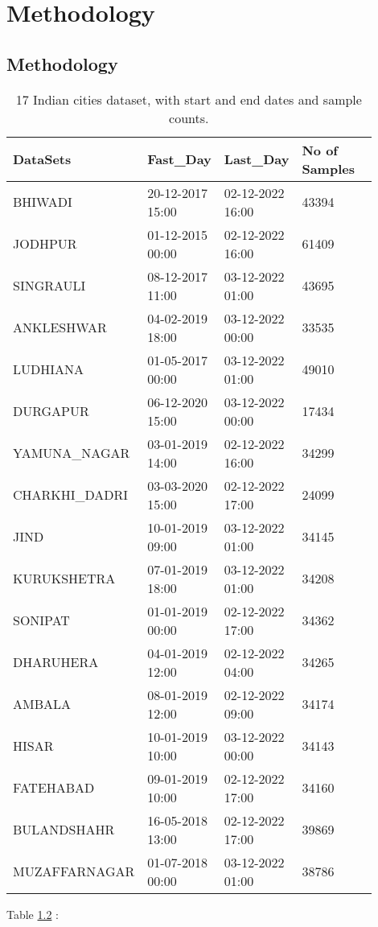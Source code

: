 
\chapter{Methodology} %

\label{c4} %

\section{Methodology}
\pagebreak

\begin{table}[H]
\setlength{\tabcolsep}{3pt}
{\renewcommand{\arraystretch}{1}%
\begin{longtable}[c]{|p{0.28\linewidth}|p{0.20\linewidth}|p{0.20\linewidth}|p{0.22\linewidth}|}%
    \caption{17 Indian cities dataset, with start and end dates and sample counts.}
\label{table:Data}
\\ \hline
\textbf{DataSets }  & \textbf{Fast\_Day} & \textbf{Last\_Day} & \textbf{No of Samples}
\\ \hline
\endhead
%
BHIWADI        & 20-12-2017 15:00 & 02-12-2022 16:00 & 43394 \\ \hline
JODHPUR        & 01-12-2015 00:00 & 02-12-2022 16:00 & 61409 \\ \hline
SINGRAULI      & 08-12-2017 11:00 & 03-12-2022 01:00 & 43695 \\ \hline
ANKLESHWAR     & 04-02-2019 18:00 & 03-12-2022 00:00 & 33535 \\ \hline
LUDHIANA       & 01-05-2017 00:00 & 03-12-2022 01:00 & 49010 \\ \hline
DURGAPUR       & 06-12-2020 15:00 & 03-12-2022 00:00 & 17434 \\ \hline
YAMUNA\_NAGAR  & 03-01-2019 14:00 & 02-12-2022 16:00 & 34299 \\ \hline
CHARKHI\_DADRI & 03-03-2020 15:00 & 02-12-2022 17:00 & 24099 \\ \hline
JIND           & 10-01-2019 09:00 & 03-12-2022 01:00 & 34145 \\ \hline
KURUKSHETRA    & 07-01-2019 18:00 & 03-12-2022 01:00 & 34208 \\ \hline
SONIPAT        & 01-01-2019 00:00 & 02-12-2022 17:00 & 34362 \\ \hline
DHARUHERA      & 04-01-2019 12:00 & 02-12-2022 04:00 & 34265 \\ \hline
AMBALA         & 08-01-2019 12:00 & 02-12-2022 09:00 & 34174 \\ \hline
HISAR          & 10-01-2019 10:00 & 03-12-2022 00:00 & 34143 \\ \hline
FATEHABAD      & 09-01-2019 10:00 & 02-12-2022 17:00 & 34160 \\ \hline
BULANDSHAHR    & 16-05-2018 13:00 & 02-12-2022 17:00 & 39869 \\ \hline
MUZAFFARNAGAR  & 01-07-2018 00:00 & 03-12-2022 01:00 & 38786 \\ \hline
\end{longtable}}

\end{table}
Table \ref{table:Data} :

